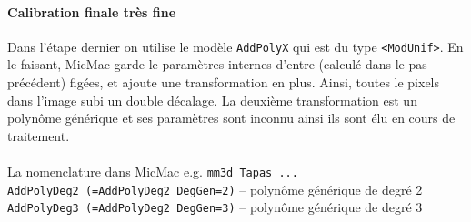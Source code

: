 \documentclass[11pt,a4paper,oneside]{book}
\begin{document}
\paragraph{Calibration finale très fine}
%
Dans l'étape dernier on utilise le modèle {\tt AddPolyX} qui est du type {\tt <ModUnif>}. En le faisant, MicMac garde le paramètres internes d'entre (calculé dans le pas précédent) figées, et ajoute une transformation en plus. Ainsi, toutes le pixels dans l'image subi un double décalage. La deuxième transformation est un polynôme générique et ses paramètres sont inconnu ainsi ils sont élu en cours de traitement.
\\
\\
La nomenclature dans MicMac e.g. {\tt mm3d Tapas ...}\\
{\tt AddPolyDeg2 (=AddPolyDeg2 DegGen=2)} – polynôme générique de degré 2\\ 
{\tt AddPolyDeg3 (=AddPolyDeg2 DegGen=3)} – polynôme générique de degré 3 
\end{document}
